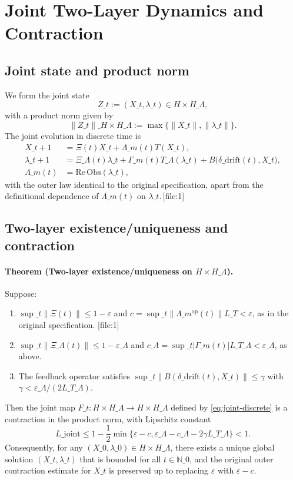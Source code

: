 \documentclass[11pt]{article}
\begin{document}
\section{Joint Two-Layer Dynamics and Contraction}

\subsection{Joint state and product norm}

We form the joint state
\[
Z\_t := (X\_t,\lambda\_t)\in H\times H\_\Lambda,
\]
with a product norm given by
\[
\|Z\_t\|\_{H\times H\_\Lambda} := \max\{\|X\_t\|,\|\lambda\_t\|\}.
\]
The joint evolution in discrete time is
\begin{equation}
\begin{aligned}
X\_{t+1} &= \Xi(t) X\_t + \Lambda\_m(t) T(X\_t),\\
\lambda\_{t+1} &= \Xi\_\Lambda(t)\lambda\_t + \Gamma\_m(t) T\_\Lambda(\lambda\_t) + B\bigl(\delta\_{\mathrm{drift}}(t), X\_t\bigr),\\
\Lambda\_m(t) &= \mathrm{Re}\,\mathrm{Obs}(\lambda\_t),
\end{aligned}
\label{eq:joint-discrete}
\end{equation}
with the outer law identical to the original specification, apart from the definitional dependence of $\Lambda\_m(t)$ on $\lambda\_t$.\,[file:1]

\subsection{Two-layer existence/uniqueness and contraction}

\paragraph{Theorem (Two-layer existence/uniqueness on $H\times H\_\Lambda$).} Suppose:
\begin{enumerate}[label=(\roman*),nosep]
  \item $\sup\_t\|\Xi(t)\|\le 1-\varepsilon$ and $c=\sup\_t\|\Lambda\_m^{\mathrm{op}}(t)\| L\_T<\varepsilon$, as in the original specification. [file:1]
  \item $\sup\_t\|\Xi\_\Lambda(t)\|\le 1-\varepsilon\_\Lambda$ and $c\_\Lambda=\sup\_t|\Gamma\_m(t)| L\_{T\_\Lambda} < \varepsilon\_\Lambda$, as above.
  \item The feedback operator satisfies $\sup\_t\|B(\delta\_{\mathrm{drift}}(t),X\_t)\|\le \gamma$ with $\gamma<\varepsilon\_\Lambda/(2L\_{T\_\Lambda})$.
\end{enumerate}
Then the joint map $F\_t: H\times H\_\Lambda\to H\times H\_\Lambda$ defined by \eqref{eq:joint-discrete} is a contraction in the product norm, with Lipschitz constant
\[
L\_{\mathrm{joint}} \le 1-\frac{1}{2}\min\{\varepsilon-c,\varepsilon\_\Lambda-c\_\Lambda-2\gamma L\_{T\_\Lambda}\} < 1.
\]
Consequently, for any $(X\_0,\lambda\_0)\in H\times H\_\Lambda$, there exists a unique global solution $(X\_t,\lambda\_t)$ that is bounded for all $t\in\mathbb{N}\_0$, and the original outer contraction estimate for $X\_t$ is preserved up to replacing $\varepsilon$ with $\varepsilon-c$.
\end{document}
